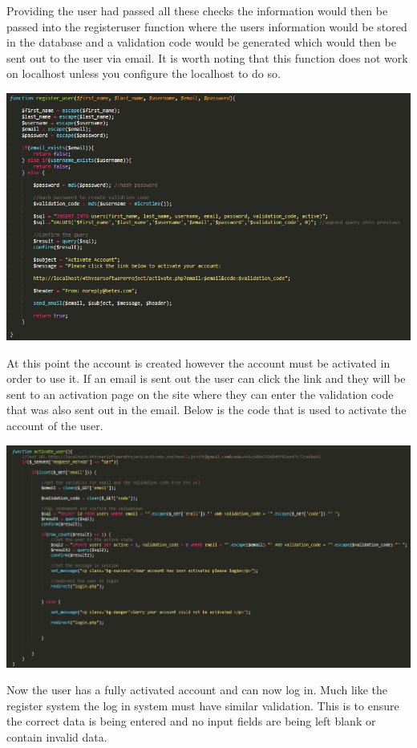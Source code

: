 Providing the user had passed all these checks the information would then be passed into the registeruser function where the users information would be stored in the database and a validation code would be generated which would then be sent out to the user via email. It is worth noting that this function does not work on localhost unless you configure the localhost to do so.

\includegraphics[width=\textwidth,height=\textheight,keepaspectratio]{img/register.png}

At this point the account is created however the account must be activated in order to use it. If an email is sent out the user can click the link and they will be sent to an activation page on the site where they can enter the validation code that was also sent out in the email. Below is the code that is used to activate the account of the user.

\includegraphics[width=\textwidth,height=\textheight,keepaspectratio]{img/activate.png}

Now the user has a fully activated account and can now log in. Much like the register system the log in system must have similar validation. This is to ensure the correct data is being entered and no input fields are being left blank or contain invalid data.

